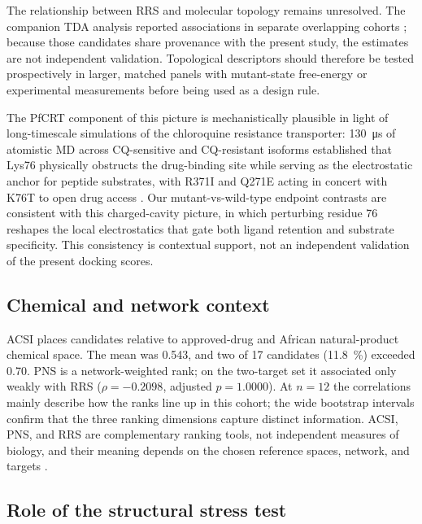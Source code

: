 \documentclass[journal=jcisd8,manuscript=article,layout=traditional]{achemso}
\begin{document}
The relationship between RRS and molecular topology remains unresolved. The companion TDA analysis reported associations in separate overlapping cohorts \citep{temgoua2026quantum}; because those candidates share provenance with the present study, the estimates are not independent validation. Topological descriptors should therefore be tested prospectively in larger, matched panels with mutant-state free-energy or experimental measurements before being used as a design rule.

The PfCRT component of this picture is mechanistically plausible in light of long-timescale simulations of the chloroquine resistance transporter: \qty{130}{\micro\second} of atomistic MD across CQ-sensitive and CQ-resistant isoforms established that Lys76 physically obstructs the drug-binding site while serving as the electrostatic anchor for peptide substrates, with R371I and Q271E acting in concert with K76T to open drug access \citep{tanner2025pfcrt}. Our mutant-vs-wild-type endpoint contrasts are consistent with this charged-cavity picture, in which perturbing residue \num{76} reshapes the local electrostatics that gate both ligand retention and substrate specificity. This consistency is contextual support, not an independent validation of the present docking scores.

\subsection{Chemical and network context}

ACSI places candidates relative to approved-drug and African natural-product chemical space. The mean was \num{0.543}, and two of \num{17} candidates (\qty{11.8}{\percent}) exceeded \num{0.70}. PNS is a network-weighted rank; on the two-target set it associated only weakly with RRS ($\rho=\num{-0.2098}$, adjusted $p=\num{1.0000}$). At $n=\num{12}$ the correlations mainly describe how the ranks line up in this cohort; the wide bootstrap intervals confirm that the three ranking dimensions capture distinct information. ACSI, PNS, and RRS are complementary ranking tools, not independent measures of biology, and their meaning depends on the chosen reference spaces, network, and targets \citep{anpdb_2026,value_addition_african_np_2025,Sentinel2025Offtarget}.

\subsection{Role of the structural stress test}
\end{document}

